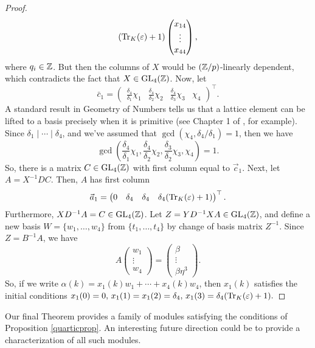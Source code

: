 \documentclass[11pt]{amsart}
\begin{document}
\begin{prop}
\begin{proof}
\[(\operatorname{Tr}_K(\varepsilon)+1) \begin{pmatrix} x_{14} \\ \vdots \\ x_{44} \end{pmatrix},\]
where $q_i \in \mathbb{Z}$. But then the columns of $X$ would be $(\mathbb{Z}/p)$-linearly dependent, which contradicts the fact that $X \in \operatorname{GL}_4(\mathbb{Z})$. Now, let 
\[\bar{c}_1 = \begin{pmatrix} \frac{\delta_4}{\delta_1} \chi_1 & \frac{\delta_4}{\delta_2}\chi_2 & \frac{\delta_4}{\delta_3}\chi_3 & \chi_4 \end{pmatrix}^{\top}.\]
A standard result in Geometry of Numbers tells us that a lattice element can be lifted to a basis precisely when it is primitive (see Chapter 1 of \cite{cassels}, for example). Since $\delta_1 \mid \cdots \mid \delta_4$, and we've assumed that $\gcd(\chi_4, \delta_4/\delta_1)=1$, then we have
\[\gcd\left(\frac{\delta_4}{\delta_1} \chi_1, \frac{\delta_4}{\delta_2}\chi_2, \frac{\delta_3}{\delta_2} \chi_3, \chi_4\right)=1.\]
So, there is a matrix $C \in \operatorname{GL}_4(\mathbb{Z})$ with first column equal to $\vec{c}_1$.
Next, let $A=X^{-1} D C$. Then, $A$ has first column
\[\vec{a}_1=\begin{pmatrix} 0 & \delta_4 & \delta_4 & \delta_4 (\operatorname{Tr}_K(\varepsilon)+1) \end{pmatrix}^{\top}.\]
Furthermore, $XD^{-1}A =C \in \operatorname{GL}_4(\mathbb{Z})$. Let $Z=YD^{-1} X A \in \operatorname{GL}_4(\mathbb{Z})$, and define a new basis $W=\{w_1, \dots, w_4\}$ from $\{t_1, \dots, t_4\}$ by change of basis matrix $Z^{-1}$. 
Since $Z=B^{-1} A$, we have
\[A \begin{pmatrix} w_1 \\ \vdots \\ w_4 \end{pmatrix} = \begin{pmatrix} \beta \\ \vdots \\ \beta \eta^3 \end{pmatrix}.\]
So, if we write $\alpha(k)=x_1(k)w_1+\cdots+x_4(k)w_4$, then $x_1(k)$ satisfies the initial conditions
$x_1(0)=0, \, x_1(1)=x_1(2)=\delta_4, \, x_1(3)=\delta_4(\operatorname{Tr}_K(\varepsilon)+1).$ 
\end{proof}
\end{prop}



Our final Theorem provides a family of modules satisfying the conditions of Proposition \ref{quarticprop}. An interesting future direction could be to provide a characterization of all such modules.
\end{document}
